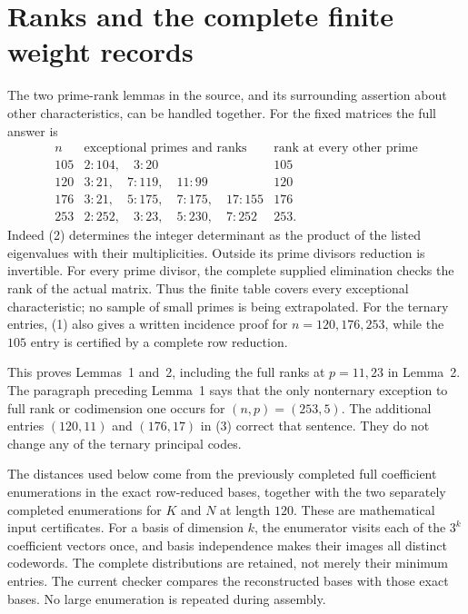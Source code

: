 \section{Ranks and the complete finite weight records}

The two prime-rank lemmas in the source, and its surrounding assertion
about other characteristics, can be handled together. For the fixed
matrices the full answer is
\[
\begin{array}{c|l|c}
n&\text{exceptional primes and ranks}&\text{rank at every other prime}\\\hline
105&2:104,\quad3:20&105\\
120&3:21,\quad7:119,\quad11:99&120\\
176&3:21,\quad5:175,\quad7:175,\quad17:155&176\\
253&2:252,\quad3:23,\quad5:230,\quad7:252&253.
\end{array}                                                     \tag{3}
\]
Indeed (2) determines the integer determinant as the product of the
listed eigenvalues with their multiplicities. Outside its prime divisors
reduction is invertible. For every prime divisor, the complete supplied
elimination checks the rank of the actual matrix. Thus the finite table
covers every exceptional characteristic; no sample of small primes is
being extrapolated. For the ternary entries, (1) also gives a written
incidence proof for $n=120,176,253$, while the $105$ entry is certified
by a complete row reduction.

This proves Lemmas~1 and~2, including the full ranks at $p=11,23$ in
Lemma~2. The paragraph preceding Lemma~1 says that the only nonternary
exception to full rank or codimension one occurs for $(n,p)=(253,5)$.
The additional entries $(120,11)$ and $(176,17)$ in (3) correct that
sentence. They do not change any of the ternary principal codes.

The distances used below come from the previously completed full
coefficient enumerations in the exact row-reduced bases, together with
the two separately completed enumerations for $K$ and $N$ at length $120$.
These are mathematical input certificates. For a basis of dimension $k$,
the enumerator visits each of the $3^k$ coefficient vectors once, and
basis independence makes their images all distinct codewords. The
complete distributions are retained, not merely their minimum entries.
The current checker compares the reconstructed bases with those exact
bases. No large enumeration is repeated during assembly.

